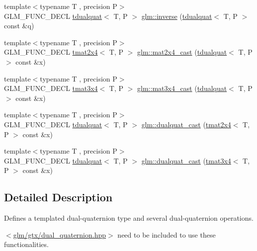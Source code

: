 \begin{DoxyCompactItemize}
\item 
{\footnotesize template$<$typename T , precision P$>$ }\\G\+L\+M\+\_\+\+F\+U\+N\+C\+\_\+\+D\+E\+CL \hyperlink{structglm_1_1tdualquat}{tdualquat}$<$ T, P $>$ \hyperlink{group__gtx__dual__quaternion_ga2149d3cb8af04d9530de0cd16aa1aab2}{glm\+::inverse} (\hyperlink{structglm_1_1tdualquat}{tdualquat}$<$ T, P $>$ const \&q)
\item 
{\footnotesize template$<$typename T , precision P$>$ }\\G\+L\+M\+\_\+\+F\+U\+N\+C\+\_\+\+D\+E\+CL \hyperlink{structglm_1_1tmat2x4}{tmat2x4}$<$ T, P $>$ \hyperlink{group__gtx__dual__quaternion_ga2d124748183e12db8288eeaca350298e}{glm\+::mat2x4\+\_\+cast} (\hyperlink{structglm_1_1tdualquat}{tdualquat}$<$ T, P $>$ const \&x)
\item 
{\footnotesize template$<$typename T , precision P$>$ }\\G\+L\+M\+\_\+\+F\+U\+N\+C\+\_\+\+D\+E\+CL \hyperlink{structglm_1_1tmat3x4}{tmat3x4}$<$ T, P $>$ \hyperlink{group__gtx__dual__quaternion_ga576745d979e3c079a64152490c816954}{glm\+::mat3x4\+\_\+cast} (\hyperlink{structglm_1_1tdualquat}{tdualquat}$<$ T, P $>$ const \&x)
\item 
{\footnotesize template$<$typename T , precision P$>$ }\\G\+L\+M\+\_\+\+F\+U\+N\+C\+\_\+\+D\+E\+CL \hyperlink{structglm_1_1tdualquat}{tdualquat}$<$ T, P $>$ \hyperlink{group__gtx__dual__quaternion_gada9799afe2b62394dc498534beb5bc78}{glm\+::dualquat\+\_\+cast} (\hyperlink{structglm_1_1tmat2x4}{tmat2x4}$<$ T, P $>$ const \&x)
\item 
{\footnotesize template$<$typename T , precision P$>$ }\\G\+L\+M\+\_\+\+F\+U\+N\+C\+\_\+\+D\+E\+CL \hyperlink{structglm_1_1tdualquat}{tdualquat}$<$ T, P $>$ \hyperlink{group__gtx__dual__quaternion_ga20eb5758beb73cc6dbc2d9104f03ec20}{glm\+::dualquat\+\_\+cast} (\hyperlink{structglm_1_1tmat3x4}{tmat3x4}$<$ T, P $>$ const \&x)
\end{DoxyCompactItemize}


\subsection{Detailed Description}
Defines a templated dual-\/quaternion type and several dual-\/quaternion operations. 

$<$\hyperlink{dual__quaternion_8hpp}{glm/gtx/dual\+\_\+quaternion.\+hpp}$>$ need to be included to use these functionalities. 

